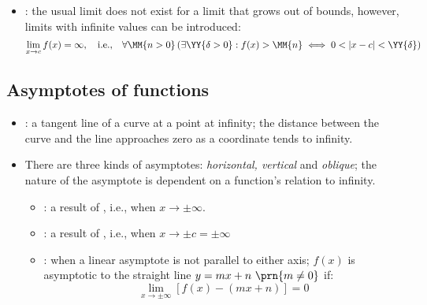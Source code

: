\begin{itemize}
\begin{itemize}
\begin{itemize}
      \end{itemize}

    \item {}: the usual limit does not exist for a limit that
      grows out of bounds, however, limits with infinite values can be
      introduced:
      \[
        \lim_{x \to c} f(x) = \infty, \quad \text{i.e.,} \quad
        \forall \MM{n > 0}\left(
          \exists \YY{ \delta > 0} : f(x) > \MM{n} \iff 0 < |x-c| < \YY{ \delta}
        \right)
      \]
  \end{itemize}

  \subsection{Asymptotes of functions}
  \begin{itemize}
    \item {}: a tangent line of a curve at a point at infinity; the
      distance between the curve and the line approaches zero as a coordinate
      tends to infinity.
    \item There are three kinds of asymptotes: \textit{horizontal, vertical}
      and \textit{oblique}; the nature of the asymptote is dependent on a
      function's relation to infinity.
      \begin{itemize}
        \item  {}: a result of , i.e., when \( x \to \pm \infty \).
        \item {}: a result of ,
          i.e., when \( x \to \pm c = \pm \infty \)
        \item {}: when a linear asymptote is not parallel
          to either axis; \( f(x) \) is asymptotic to the straight line \( y =
          mx + n~ \prn{m\neq 0} \) if:
          \[
            \lim_{x \to \pm \infty} \left[ f(x) - (mx+n) \right] = 0
          \]
      \end{itemize}

  \end{itemize}

\end{itemize}
